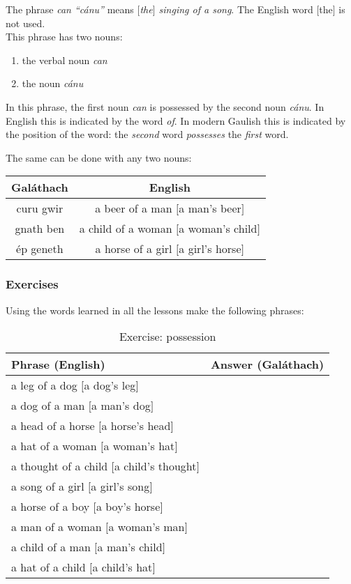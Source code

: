 \noindent The phrase \textit{can ``c\'{a}nu''} means \textit{$[$the$]$ singing of a song}. The English word $[$the$]$ is not used.\\

\noindent This phrase has two nouns:
\begin{enumerate}
 \item{the verbal noun \textit{can}}
 \item{the noun \textit{c\'{a}nu}}
\end{enumerate}
\noindent In this phrase, the first noun \textit{can} is possessed by the second noun \textit{c\'{a}nu}. In English this is indicated by the word \textit{of}. In modern Gaulish this is indicated by the position of the word: the \textit{second} word \textit{possesses} the \textit{first} word.

\noindent The same can be done with any two nouns:
\begin{table}[H]
\centering
\begin{tabu}{c|c}
  \textbf{Gal\'{a}thach} & \textbf{English}\\
  \toprule
  curu gwir & a beer of a man $[$a man's beer$]$\\
  gnath ben & a child of a woman $[$a woman's child$]$\\
  \'{e}p geneth & a horse of a girl $[$a girl's horse$]$
\end{tabu}
\label{examples_possession_word_position}
\end{table}

\subsubsection{Exercises}

\noindent Using the words learned in all the lessons make the following phrases:
\begin{table}[H]
\centering
\begin{tabu}{|l|p{10.0cm}|}
  \toprule
  \textbf{Phrase (English)} & \textbf{Answer (Gal\'{a}thach)}\\
  \toprule
  a leg of a dog $[$a dog's leg$]$ & \\
  \midrule
  a dog of a man $[$a man's dog$]$ & \\
  \midrule
  a head of a horse $[$a horse's head$]$ & \\
  \midrule
  a hat of a woman $[$a woman's hat$]$ & \\
  \midrule
  a thought of a child $[$a child's thought$]$ & \\
  \midrule
  a song of a girl $[$a girl's song$]$ & \\
  \midrule
  a horse of a boy $[$a boy's horse$]$ & \\
  \midrule
  a man of a woman $[$a woman's man$]$ & \\
  \midrule
  a child of a man $[$a man's child$]$ & \\
  \midrule
  a hat of a child $[$a child's hat$]$ & \\
  \bottomrule
\end{tabu}
\label{exercises_possession}
\caption{Exercise: possession}
\end{table}

